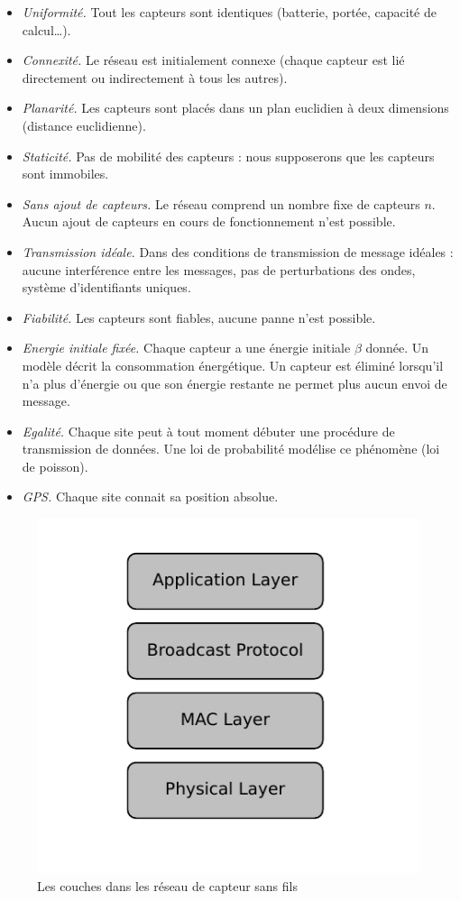 \begin{itemize}
 \item \textit{Uniformité.} Tout les capteurs sont identiques (batterie, portée, capacité de calcul…).
 \item \textit{Connexité.} Le réseau est initialement connexe (chaque capteur est lié directement ou indirectement à tous les autres).
 \item \textit{Planarité.} Les capteurs sont placés dans un plan euclidien à deux dimensions (distance euclidienne).
 \item \textit{Staticité.} Pas de mobilité des capteurs : nous supposerons que les capteurs sont immobiles.
 \item \textit{Sans ajout de capteurs.} Le réseau comprend un nombre fixe de capteurs $n$. Aucun ajout de capteurs en cours de fonctionnement n'est possible.
 \item \textit{Transmission idéale.} Dans des conditions de transmission de message idéales : aucune interférence entre les messages, pas de perturbations des ondes, système d'identifiants uniques.
 \item \textit{Fiabilité.} Les capteurs sont fiables, aucune panne n'est possible.
 \item \textit{Energie initiale fixée.} Chaque capteur a une énergie initiale $\beta$ donnée. Un modèle décrit la consommation énergétique. Un capteur est éliminé lorsqu'il n'a plus d'énergie ou que son énergie 
 restante ne permet plus aucun envoi de message. 
 \item \textit{Egalité.} Chaque site peut à tout moment débuter une procédure de transmission de données. Une loi de probabilité modélise ce phénomène (loi de poisson).
 \item \textit{GPS.} Chaque site connait sa position absolue.  \\
\end{itemize}




\begin{figure}[h]
\centering
\includegraphics[scale=0.9]{Etat_de_l'art/source/layer.pdf}
\caption{\label{Layer} Les couches dans les réseau de capteur sans fils}
\end{figure}

